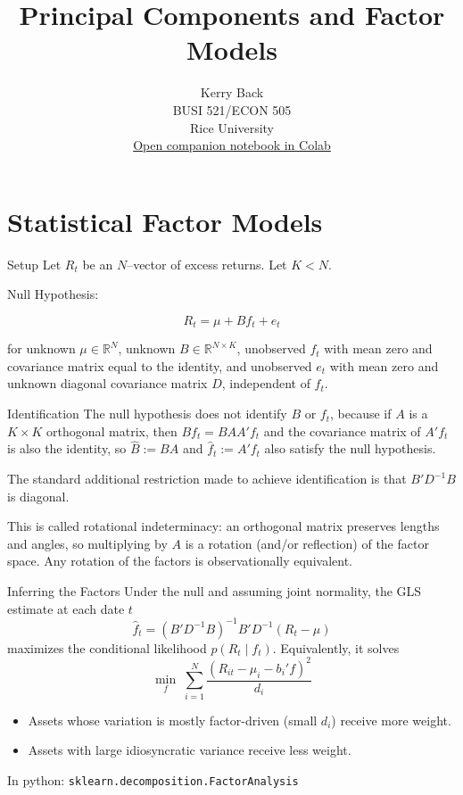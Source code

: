 \documentclass[10pt]{beamer}
\title{Principal Components and Factor Models}
\date{}
\author{Kerry Back\\
BUSI 521/ECON 505\\
Rice University\\[1em]
\small\href{https://colab.research.google.com/github/kerryback/busi521/blob/main/FactorAnalysisPrincipalComponents.ipynb}{Open companion notebook in Colab}}
\newcommand{\bi}{\begin{itemize}}
\newcommand{\ei}{\end{itemize}}
\newcommand{\im}{\item}
\begin{document}
\maketitle

\section{Statistical Factor Models}

\begin{frame}{Setup}
Let $R_t$ be an $N$--vector of excess returns.  Let $K<N$.

Null Hypothesis:

$$R_t = \mu + Bf_t + e_t$$

for unknown  $\mu \in \mathbb{R}^N$, unknown $B \in \mathbb{R}^{N\times K}$, unobserved $f_t$ with mean zero and covariance matrix equal to the identity, and unobserved $e_t$ with mean zero and unknown diagonal covariance matrix $D$, independent of $f_t$.  
\end{frame}

\begin{frame}{Identification}
The null hypothesis does not identify $B$ or $f_t$, because if $A$ is a $K \times K$ orthogonal matrix, then $Bf_t = BAA'f_t$ and the covariance matrix of $A'f_t$ is also the identity, so $\hat B := BA$ and $\hat f_t := A'f_t$ also satisfy the null hypothesis.

The standard additional restriction made to achieve identification is that $B'D^{-1}B$ is diagonal.

\medskip
This is called \alert{rotational indeterminacy}: an orthogonal matrix preserves lengths and angles, so multiplying by $A$ is a rotation (and/or reflection) of the factor space.  Any rotation of the factors is observationally equivalent.
\end{frame}

\begin{frame}{Inferring the Factors}
Under the null and assuming joint normality, the GLS estimate at each date $t$
$$\hat{f}_t = (B'D^{-1}B)^{-1}B'D^{-1}(R_t - \mu)$$
maximizes the conditional likelihood $p(R_t \mid f_t)$.  Equivalently, it solves
$$\min_f \; \sum_{i=1}^N \frac{(R_{it} - \mu_i - b_i'f)^2}{d_i}$$

\bi
\im Assets whose variation is mostly factor-driven (small $d_i$) receive \alert{more} weight.
\im Assets with large idiosyncratic variance receive less weight.
\ei

\medskip
In python: \texttt{sklearn.decomposition.FactorAnalysis}
\end{frame}
\end{document}
